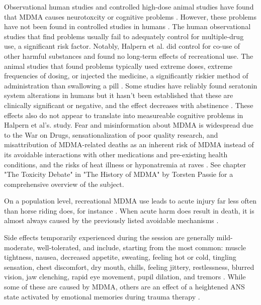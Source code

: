 \documentclass[12pt,letterpaper]{article}
\begin{document}
Observational human studies and controlled high-dose animal studies have found that MDMA causes neurotoxcity or cognitive problems \cite{passieHistory}. However, these problems have not been found in controlled studies in humans \cite{halpernMormonRavers,mitchellMDMAClinicalTrial}. The human observational studies that find problems usually fail to adequately control for multiple-drug use, a significant risk factor. Notably, Halpern et al. did control for co-use of other harmful substances and found no long-term effects of recreational use. The animal studies that found problems typically used extreme doses, extreme frequencies of dosing, or injected the medicine, a significantly riskier method of administration than swallowing a pill \cite{passieHistory}. Some studies have reliably found seratonin system alterations in humans but it hasn't been established that these are clinically significant or negative, and the effect decreases with abstinence \cite{gouzoulis2006neurotoxicity}. These effects also do not appear to translate into measureable cognitive problems in Halpern et al's. study. Fear and misinformation about MDMA is widespread due to the War on Drugs, sensationalization of poor quality research, and misattribution of MDMA-related deaths as an inherent risk of MDMA instead of its avoidable interactions with other medications and pre-existing health conditions, and the risks of heat illness or hyponatremia at raves \cite{passieHistory}. See chapter "The Toxicity Debate" in "The History of MDMA" by Torsten Passie for a comprehensive overview of the subject.

On a population level, recreational MDMA use leads to acute injury far less often than horse riding does, for instance \cite{nutt2009equasy}. When acute harm does result in death, it is almost always caused by the previously listed avoidable mechanisms \cite{riggDeaths}.

Side effects temporarily experienced during the session are generally mild-moderate, well-tolerated, and include, starting from the most common: muscle tightness, nausea, decreased appetite, sweating, feeling hot or cold, tingling sensation, chest discomfort, dry mouth, chills, feeling jittery, restlessness, blurred vision, jaw clenching, rapid eye movement, pupil dilation, and tremors \cite{mitchellMDMAClinicalTrial2}. While some of these are caused by MDMA, others are an effect of a heightened ANS state activated by emotional memories during trauma therapy \cite{kozlowskaDefenseCascade}.

\vspace{\baselineskip}
\end{document}
